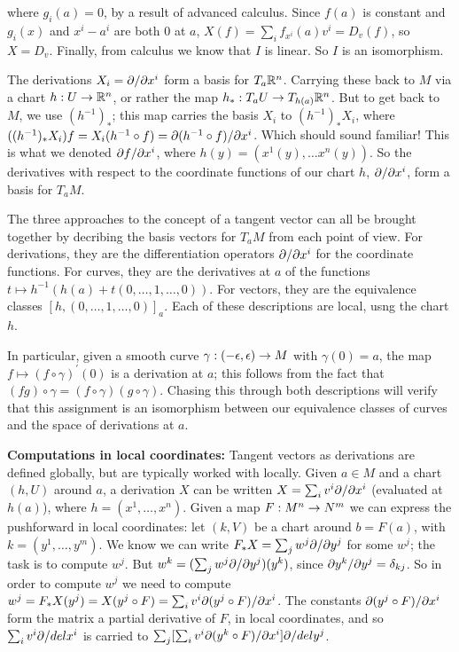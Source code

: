 \ssk

\noindent where $g_i(a)=0$, by a result of advanced calculus. Since $f(a)$ is constant and
$g_i(x)$ and $x^i-a^i$ are both $0$ at $a$, $X(f)=\sum_i f_{x^i}(a)v^i=D_v(f)$, so $X=D_v$.
Finally, from calculus we know that $I$ is linear. So $I$ is an isomorphism.

\msk

The derivations $X_i=\partial/\partial x^i$ form a basis for $T_a{\Bbb R}^n$. Carrying these back to $M$ via 
a chart $h:U\rightarrow{\Bbb R}^n$, or rather the map $h_*:T_aU\rightarrow T_{h(a)}{\Bbb R}^n$. But to get back
to $M$, we use $(h^{-1})_*$;  this map carries the basis $X_i$ to
$(h^{-1})_*X_i$, where $((h^{-1})_*X_i)f=X_i(h^{-1}\circ f)=\partial(h^{-1}\circ f)/\partial x^i$.
Which should sound familiar! This is what we denoted $\partial f/\partial x^i$, where 
$h(y)=(x^1(y),\ldots x^n(y))$. So the derivatives with respect to the coordinate functions
of our chart $h$, $\partial/\partial x^i$, form a basis for $T_aM$. 

\ssk

The three approaches to the concept of a tangent vector can all be brought together by decribing
the basis vectors for $T_aM$ from each point of view. For derivations, they are the differentiation
operators $\partial/\partial x^i$ for the coordinate functions. For curves, they are the derivatives
at $a$ of the functions $t\mapsto h^{-1}(h(a)+t(0,\ldots ,1,\ldots ,0))$. For vectors, they
are the equivalence classes $[h,(0,\ldots ,1,\ldots ,0)]_a$. Each of these descriptions are
local, usng the chart $h$.

In particular, given a smooth curve $\gamma:(-\epsilon,\epsilon)\rightarrow M$ with $\gamma(0)=a$,
the map $f\mapsto (f\circ \gamma)^\prime(0)$ is a derivation at $a$; this follows
from the fact that $(fg)\circ\gamma = (f\circ\gamma)(g\circ\gamma)$. Chasing this through
both descriptions will verify that this assignment is an isomorphism between our 
equivalence classes of curves and the space of derivations at $a$.

\msk

{\bf Computations in local coordinates:} Tangent vectors as derivations are defined globally, 
but are typically worked with locally. Given $a\in M$ and a chart $(h,U)$ around $a$, 
a derivation $X$ can be written $X=\sum_i v^i\partial/\partial x^i$ (evaluated at $h(a)$), 
where $h=(x^1,\ldots ,x^n)$.
Given a map $F:M^n\rightarrow N^m$ we can express the pushforward in local coordinates: let 
$(k,V)$ be a chart around $b=F(a)$, with $k=(y^1,\ldots ,y^m)$. We know we can write 
$F_*X=\sum_j w^j\partial/\partial y^j$ for some $w^j$; the task is to compute $w^j$. But
$w^k=(\sum_j w^j\partial/\partial y^j)(y^k)$, since $\partial y^k/\partial y^j=\delta_{kj}$.
So in order to compute $w^j$ we need to compute 
$w^j=F_*X(y^j)= X(y^j\circ F) = \sum_i v^i\partial(y^j\circ F)/\partial x^i$.
The constants $\partial(y^j\circ F)/\partial x^i$ form the matrix a partial derivative of $F$, 
in local coordinates, and so $\sum_i v^i\partial/del x^i$ is carried to 
$\sum_j[\sum_i v^i\partial(y^k\circ F)/\partial x^i]\partial/del y^j$. 

